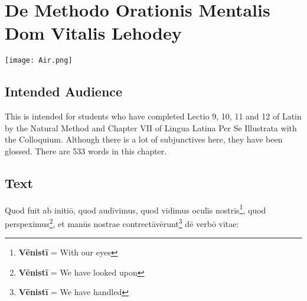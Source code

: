 \chapter{De Methodo Orationis Mentalis Dom Vitalis Lehodey}
\begin{center}
\texttt{[image: Air.png]}
\end{center}

\section{Intended Audience}
This is intended for students who have completed Lectio 9, 10, 11 and 12 of Latin by the Natural Method and Chapter VII of Lingua Latina Per Se Illustrata with the Colloquium. Although there is a lot of subjunctives here, they have been glossed. There are 533 words in this chapter.

\section{Text}

Quod fuit ab initiō, quod audīvimus, quod vīdimus oculīs nostrīs\footnote{\textbf{Vēnistī} = With our eyes}, quod perspeximus\footnote{\textbf{Vēnistī} = We have looked upon}, et manūs nostrae contrectāvērunt\footnote{\textbf{Vēnistī} = We have handled} dē verbō vītae:

